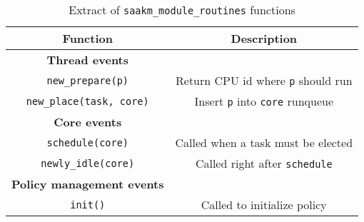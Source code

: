 \begin{table}[htbp]
        \caption{Extract of \texttt{saakm\_module\_routines} functions}
        \begin{tabular}{|c|c|}
        \hline
        \textbf{Function} & \textbf{Description} \\
        \hline
                \textbf{Thread events} & \\
                \hline
                \texttt{new\_prepare(p)} & Return CPU id where \texttt{p} should run\\
                \texttt{new\_place(task, core)} & Insert \texttt{p} into \texttt{core} runqueue\\
        
                \hline
                \textbf{Core events} & \\
                \hline
                \texttt{schedule(core)} & Called when a task must be elected\\
                \texttt{newly\_idle(core)} & Called right after \texttt{schedule}\\
                \hline
                \textbf{Policy management events} & \\
                \texttt{init()} & Called to initialize policy\\
                \hline
        \end{tabular}
        
\label{tab:saakm-callbacks}
\end{table}

